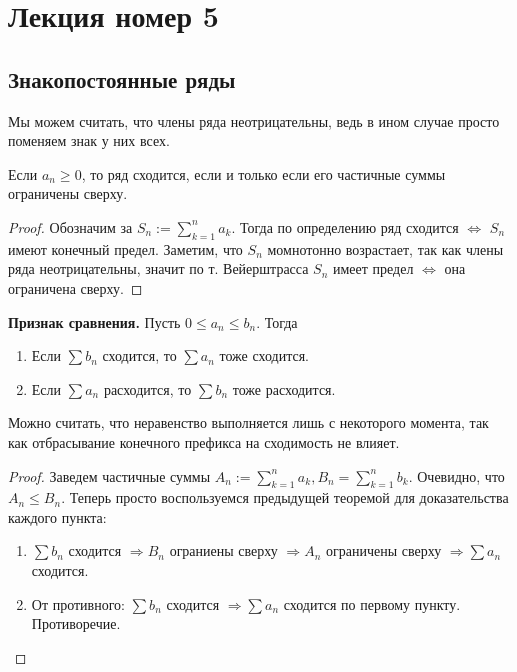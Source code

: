 \section{Лекция номер 5}
\subsection{Знакопостоянные ряды}
Мы можем считать, что члены ряда неотрицательны, ведь в ином случае просто поменяем знак у них всех.

\begin{theorem}
    Если $a_n \geqslant 0$, то ряд сходится, если и только если его частичные суммы ограничены сверху.
\end{theorem}
\begin{proof}
    Обозначим за $S_n := \sum\limits_{k=1}^n a_k$. 
    Тогда по определению ряд сходится $\Leftrightarrow$ $S_n$ имеют конечный предел.
    Заметим, что $S_n$ момнотонно возрастает, так как члены ряда неотрицательны, значит по т. Вейерштрасса $S_n$ имеет предел $\Leftrightarrow$ она ограничена сверху.
\end{proof}

\vspace{4mm}

\textbf{Признак сравнения.} 
Пусть $0 \leqslant a_n \leqslant b_n$. 
Тогда \begin{enumerate}
    \item Если $\sum b_n$ сходится, то $\sum a_n$ тоже сходится.
    \item Если $\sum a_n$ расходится, то $\sum b_n$ тоже расходится.
\end{enumerate}
Можно считать, что неравенство выполняется лишь с некоторого момента, так как отбрасывание конечного префикса на сходимость не влияет.
\begin{proof}
    Заведем частичные суммы $A_n := \sum\limits_{k=1}^n a_k, B_n = \sum\limits_{k=1}^n b_k$.
    Очевидно, что $A_n \leqslant B_n$.
    Теперь просто воспользуемся предыдущей теоремой для доказательства каждого пункта:
    \begin{enumerate}
        \item $\sum b_n$ сходится $\Rightarrow B_n$ ограниены сверху $\Rightarrow A_n$ ограничены сверху $\Rightarrow \sum a_n$ сходится. 
        \item От противного: $\sum b_n$ сходится $\Rightarrow \sum a_n$ сходится по первому пункту. Противоречие. 
    \end{enumerate}
\end{proof}

